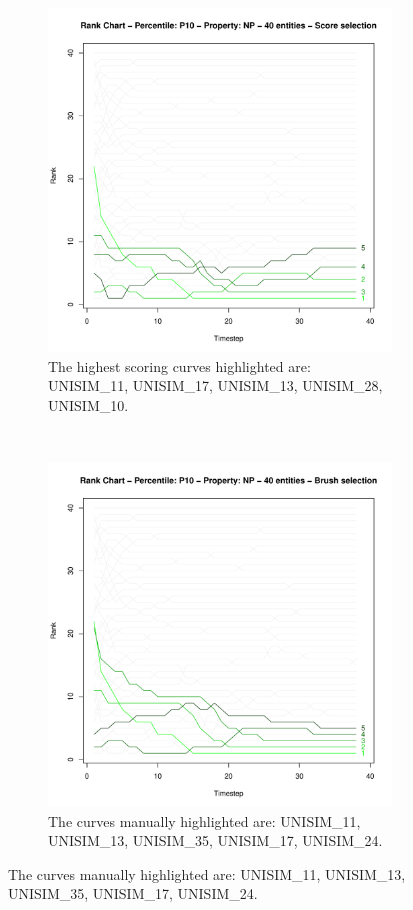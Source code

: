 \documentclass[final,5p,times,twocolumn]{elsarticle}
\begin{document}
\begin{figure}[H]
  \begin{subfigure}[b]{0.48\columnwidth}
    \includegraphics[width=\columnwidth]{rank-score-40.pdf}
    \caption{The highest scoring curves highlighted are: UNISIM\_11, UNISIM\_17, UNISIM\_13, UNISIM\_28, UNISIM\_10.}
    \label{fig:rank-score-sample}
  \end{subfigure}
  ~
  \begin{subfigure}[b]{0.48\columnwidth}
    \includegraphics[width=\columnwidth]{rank-brush-40.pdf}
    \caption{The curves manually highlighted are: UNISIM\_11, UNISIM\_13, UNISIM\_35, UNISIM\_17, UNISIM\_24.}
    \label{fig:rank-brush-sample}
  \end{subfigure}


\end{figure}
\end{document}
